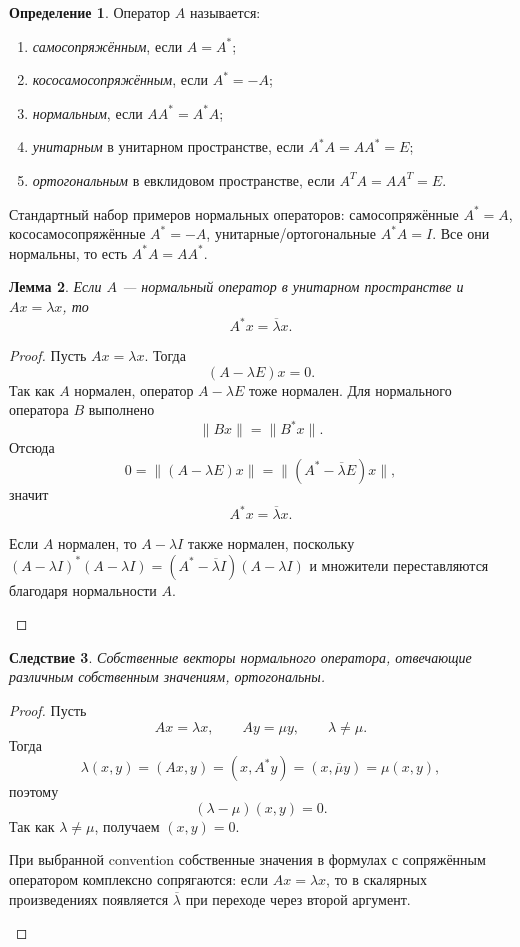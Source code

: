 \documentclass[12pt,a4paper]{article}
\theoremstyle{definition}
\newtheorem{definition}{Определение}[section]
\theoremstyle{plain}
\newtheorem{lemma}[definition]{Лемма}
\newtheorem{corollary}[definition]{Следствие}
\theoremstyle{remark}
\newenvironment{knowledgefix}{\begin{clarifybox}}{\end{clarifybox}}
\begin{document}
\begin{definition}
Оператор $A$ называется:
\begin{enumerate}[label=\arabic*)]
    \item \emph{самосопряжённым}, если $A=A^*$;
    \item \emph{кососамосопряжённым}, если $A^*=-A$;
    \item \emph{нормальным}, если $AA^*=A^*A$;
    \item \emph{унитарным} в унитарном пространстве, если $A^*A=AA^*=E$;
    \item \emph{ортогональным} в евклидовом пространстве, если $A^TA=AA^T=E$.
\end{enumerate}
\begin{knowledgefix}
Стандартный набор примеров нормальных операторов: самосопряжённые \(A^*=A\), кососамосопряжённые \(A^*=-A\), унитарные/ортогональные \(A^*A=I\). Все они нормальны, то есть \(A^*A=AA^*\).
\end{knowledgefix}
\end{definition}

\begin{lemma}
Если $A$ --- нормальный оператор в унитарном пространстве и $Ax=\lambda x$, то
\[
    A^*x=\overline{\lambda}x.
\]
\end{lemma}

\begin{proof}
Пусть $Ax=\lambda x$. Тогда
\[
    (A-\lambda E)x=0.
\]
Так как $A$ нормален, оператор $A-\lambda E$ тоже нормален. Для нормального оператора $B$ выполнено
\[
    \|Bx\|=\|B^*x\|.
\]
Отсюда
\[
    0=\|(A-\lambda E)x\|=\|(A^*-\overline\lambda E)x\|,
\]
значит
\[
    A^*x=\overline\lambda x.
\]
\begin{knowledgefix}
Если \(A\) нормален, то \(A-\lambda I\) также нормален, поскольку \((A-\lambda I)^*(A-\lambda I)=(A^*-\overline\lambda I)(A-\lambda I)\) и множители переставляются благодаря нормальности \(A\).
\end{knowledgefix}
\end{proof}

\begin{corollary}
Собственные векторы нормального оператора, отвечающие различным собственным значениям, ортогональны.
\end{corollary}

\begin{proof}
Пусть
\[
    Ax=\lambda x,
    \qquad
    Ay=\mu y,
    \qquad
    \lambda\ne\mu.
\]
Тогда
\[
    \lambda(x,y)=(Ax,y)=(x,A^*y)=(x,\overline\mu y)=\mu(x,y),
\]
поэтому
\[
    (\lambda-\mu)(x,y)=0.
\]
Так как $\lambda\ne\mu$, получаем $(x,y)=0$.
\begin{knowledgefix}
При выбранной convention собственные значения в формулах с сопряжённым оператором комплексно сопрягаются: если \(Ax=\lambda x\), то в скалярных произведениях появляется \(\overline\lambda\) при переходе через второй аргумент.
\end{knowledgefix}
\end{proof}
\end{document}
